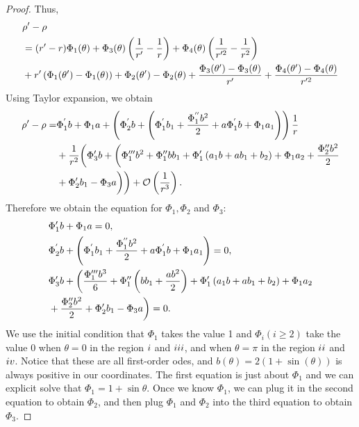 \documentclass{article}
\numberwithin{figure}{section}
\numberwithin{equation}{section}
\theoremstyle{remark}
\theoremstyle{definition}
\begin{document}
{\begin{proof}
    Thus,
    \begin{align}\label{expanding}
        & {\rho'} - \rho \notag\\ 
        &=(r'-r)\Phi_{1}(\theta) + \Phi_{3}(\theta)\left(\frac{1}{r'}-\frac{1}{r}\right) + \Phi_{4}(\theta)\left(\frac{1}{r'^2}-\frac{1}{r^2}\right)\notag \\
        &+r'\left(\Phi_{1}(\theta')-\Phi_1(\theta)\right) + \Phi_{2}(\theta')-\Phi_2(\theta) + \frac{\Phi_{3}(\theta')-\Phi_3(\theta)}{r'} + \frac{\Phi_{4}(\theta')-\Phi_4(\theta)}{r'^{2}} 
        \end{align}
        Using Taylor expansion, we obtain
        \begin{align}
        \rho'-\rho= & \Phi_{1}^{'}b + \Phi_{1}a + \left( \Phi_{2}^{'}b+\left(\Phi_{1}^{'}b_{1} + \frac{\Phi_{1}^{''}b^{2}}{2} + a\Phi_{1}^{'}b + \Phi_{1}a_{1}  \right) \right)\frac{1}{r} \notag\\
         &+\frac{1}{r^2}\biggl(\Phi_3'b+\biggl(\Phi_1'''b^2+\Phi_1''bb_1+\Phi_1'\left(a_1b+ab_1+b_2\right)+\Phi_1a_2+\frac{\Phi_2''b^2}{2}\notag\\
        & +\Phi_2'b_1-\Phi_3a\biggr)\biggr) 
         +\mathcal{O}\left(\frac{1}{r^3}\right).
    \end{align}
Therefore we obtain the equation for $\Phi_1,\Phi_2$ and $\Phi_3$:
    \begin{align}\label{equations about phi}
     &\Phi_1'b+\Phi_1a=0,\notag \\
         &\Phi_{2}^{'}b+\left(\Phi_{1}^{'}b_{1} + \frac{\Phi_{1}^{''}b^{2}}{2} + a\Phi_{1}^{'}b + \Phi_{1}a_{1}\right) =0,\notag \\ 
         &\Phi_3'b+\biggl(\frac{\Phi_1'''b^3}{6}+\Phi_1''\left(bb_1+\frac{ab^2}{2}\right)+\Phi_1'\left(a_1b+ab_1+b_2\right)+\Phi_1a_2 \notag\\
         &+\frac{\Phi_2''b^2}{2}+\Phi_2'b_1-\Phi_3a\biggr)=0.
    \end{align}
    We use the initial condition that $\Phi_1$ takes the value 1 and \(\Phi_{i}(i \geq 2)\) take the value 0 when \(\theta = 0\) in the region $\uppercase\expandafter{\romannumeral1}$ and $\uppercase\expandafter{\romannumeral3}$, and when \(\theta = \pi\) in the region $\uppercase\expandafter{\romannumeral2}$ and $\uppercase\expandafter{\romannumeral4}$. Notice that these are all first-order odes, and $b(\theta)=2(1+\sin(\theta))$ is always positive in our coordinates. The first equation is just about $\Phi_1$ and we can explicit solve that $\Phi_1=1+\sin\theta$. Once we know $\Phi_1$, we can plug it in the second equation to obtain $\Phi_2$, and then plug $\Phi_1$ and $\Phi_2$ into the third equation to obtain $\Phi_3$. 

\end{proof}}
\end{document}

